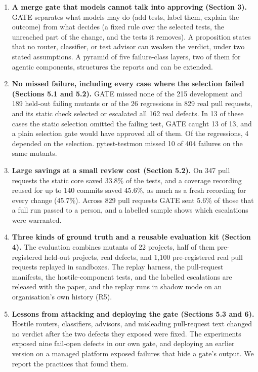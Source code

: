 \documentclass[conference]{IEEEtran}
\providecommand{\tightlist}{\setlength{\itemsep}{0pt}\setlength{\parskip}{0pt}}
\begin{document}
\begin{enumerate}
\def\labelenumi{\arabic{enumi}.}
\tightlist
\item
  \textbf{A merge gate that models cannot talk into approving (Section 3).} GATE separates what models may do (add tests, label them, explain the outcome) from what decides (a fixed rule over the selected tests, the unreached part of the change, and the tests it removes). A proposition states that no router, classifier, or test advisor can weaken the verdict, under two stated assumptions. A pyramid of five failure-class layers, two of them for agentic components, structures the reports and can be extended.
\item
  \textbf{No missed failure, including every case where the selection failed (Sections 5.1 and 5.2).} GATE missed none of the 215 development and 189 held-out failing mutants or of the 26 regressions in 829 real pull requests, and its static check selected or escalated all 162 real defects. In 13 of these cases the static selection omitted the failing test, GATE caught 13 of 13, and a plain selection gate would have approved all of them. Of the regressions, 4 depended on the selection. pytest-testmon missed 10 of 404 failures on the same mutants.
\item
  \textbf{Large savings at a small review cost (Section 5.2).} On 347 pull requests the static core saved 33.8\% of the tests, and a coverage recording reused for up to 140 commits saved 45.6\%, as much as a fresh recording for every change (45.7\%). Across 829 pull requests GATE sent 5.6\% of those that a full run passed to a person, and a labelled sample shows which escalations were warranted.
\item
  \textbf{Three kinds of ground truth and a reusable evaluation kit (Section 4).} The evaluation combines mutants of 22 projects, half of them pre-registered held-out projects, real defects, and 1,100 pre-registered real pull requests replayed in sandboxes. The replay harness, the pull-request manifests, the hostile-component tests, and the labelled escalations are released with the paper, and the replay runs in shadow mode on an organisation's own history (R5).
\item
  \textbf{Lessons from attacking and deploying the gate (Sections 5.3 and 6).} Hostile routers, classifiers, advisors, and misleading pull-request text changed no verdict after the two defects they exposed were fixed. The experiments exposed nine fail-open defects in our own gate, and deploying an earlier version on a managed platform exposed failures that hide a gate's output. We report the practices that found them.
\end{enumerate}
\end{document}
